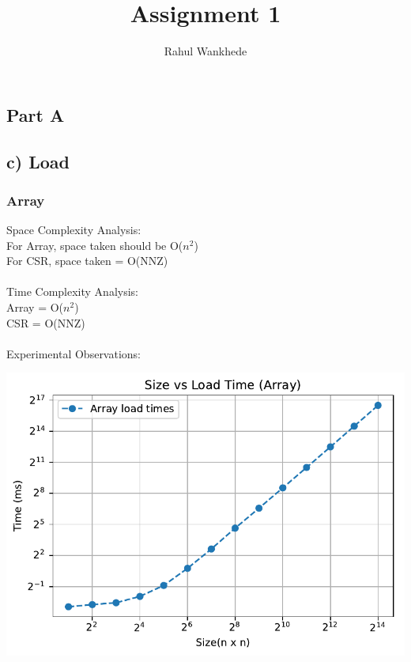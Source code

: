 \documentclass[12pt, a4paper]{report}
\title{Assignment 1 \\
}
\author{Rahul Wankhede}
\begin{document}
\maketitle

\begin{center}
\section*{Part A}
\end{center}

\subsection*{c) Load}
\subsubsection*{Array}

Space Complexity Analysis: \\
For Array, space taken should be O($n^2$) \\
For CSR, space taken = O(NNZ) \\~\\
Time Complexity Analysis: \\
Array = O($n^2$) \\
CSR = O(NNZ) \\~\\
Experimental Observations: \\

\begin{center}
\includegraphics{load_arr.pdf}
\end{center}
\end{document}
